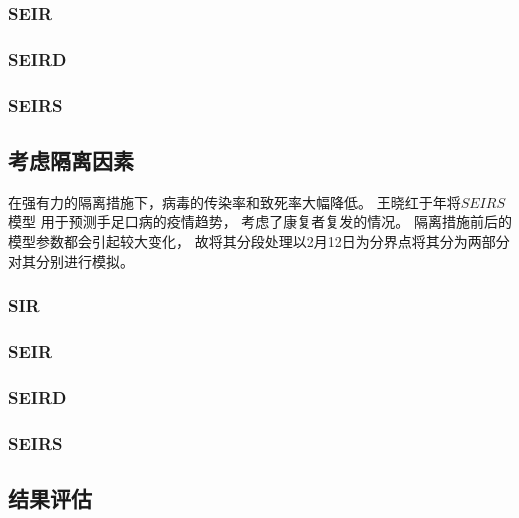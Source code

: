 \subsubsection{SEIR}
\subsubsection{SEIRD}
\subsubsection{SEIRS}
\subsection{考虑隔离因素}
\par
在强有力的隔离措施下，病毒的传染率和致死率大幅降低。
王晓红于\citeyear{一类具有潜伏期的SEIR手足口病模型的研究}年将$SEIRS$模型
用于预测手足口病的疫情趋势\cite{一类具有潜伏期的SEIR手足口病模型的研究}，
考虑了康复者复发的情况。
隔离措施前后的模型参数都会引起较大变化，
故将其分段处理以2月12日为分界点将其分为两部分对其分别进行模拟。
\subsubsection{SIR}
\subsubsection{SEIR}
\subsubsection{SEIRD}
\subsubsection{SEIRS}
\subsection{结果评估}